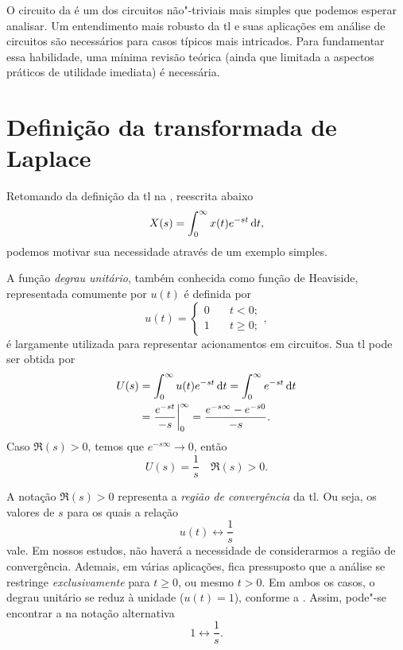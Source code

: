 O circuito da  é um dos circuitos não"-triviais mais simples que podemos esperar analisar. Um entendimento mais robusto da \ac{tl} e suas aplicações em análise de circuitos são necessários para casos típicos mais intricados. Para fundamentar essa habilidade, uma mínima revisão teórica (ainda que limitada a aspectos práticos de utilidade imediata) é necessária.

\section{Definição da transformada de Laplace}

Retomando da definição da \ac{tl} na , reescrita abaixo
\begin{equation*}
	X(s)=\inte{x(t)e^{-st}}{t}{0}{\infty},
\end{equation*}
podemos motivar sua necessidade através de um exemplo simples.

A função \emph{degrau unitário}, também conhecida como função de Heaviside, representada comumente por $u(t)$ é definida por
\begin{equation}\label{eq:heaviside}
	\boxed{u(t)=\begin{cases}
		0\quad&t<0;\\
		1\quad&t\geq0;
	\end{cases}},
\end{equation}
é largamente utilizada para representar acionamentos em circuitos. Sua \ac{tl} pode ser obtida por
\begin{align*}
	U(s)&=\inte{u(t)e^{-st}}{t}{0}{\infty}=\inte{e^{-st}}{t}{0}{\infty}\\
		&=\frac{e^{-st}}{-s}\bigg|_{0}^{\infty}=\frac{e^{-s\infty}-e^{-s0}}{-s}.
\end{align*}
Caso $\Re(s)>0$, temos que $e^{-s\infty}\to0$, então
\begin{equation*}
	U(s)=\frac{1}{s}\quad\Re(s)>0.
\end{equation*}

A notação $\Re(s)>0$ representa a \emph{região de convergência} da \ac{tl}. Ou seja, os valores de $s$ para os quais a relação
\begin{equation}\label{eq:tlheaviside}
	\boxed{u(t)\longleftrightarrow\frac{1}{s}}
\end{equation}
vale. Em nossos estudos, não haverá a necessidade de considerarmos a região de convergência. Ademais, em várias aplicações, fica pressuposto que a análise se restringe \emph{exclusivamente} para $t\geq0$, ou mesmo $t>0$. Em ambos os casos, o degrau unitário se reduz à unidade ($u(t)=1$), conforme a . Assim, pode"-se encontrar a  na notação alternativa
\begin{equation}
	1\longleftrightarrow\frac{1}{s}.
\end{equation}

